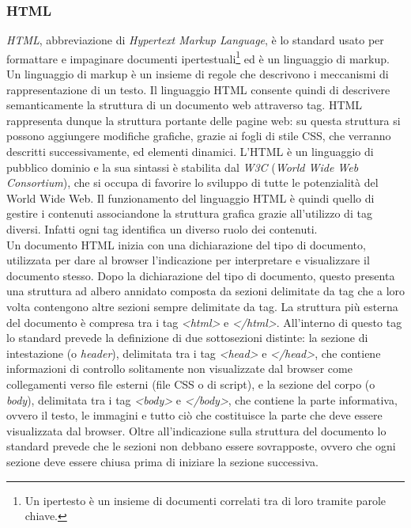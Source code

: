   \subsubsection{HTML}
  \textit{HTML}, abbreviazione di \textit{Hypertext Markup Language}, è lo standard usato per formattare e
  impaginare documenti
  ipertestuali\footnote{Un ipertesto è un insieme di documenti correlati tra di loro tramite parole chiave.} ed è un linguaggio
  di markup. Un linguaggio di markup è un insieme di regole che descrivono i meccanismi di rappresentazione di un testo. 
  Il linguaggio HTML consente quindi di descrivere semanticamente la struttura di un documento web attraverso tag. 
  HTML rappresenta dunque la struttura portante delle pagine web: su questa struttura si possono aggiungere modifiche grafiche,
  grazie ai fogli di stile CSS, che verranno descritti successivamente, ed elementi dinamici. L'HTML è un linguaggio di pubblico
  dominio e la sua sintassi è stabilita dal \textit{W3C} (\textit{World Wide Web Consortium}), che si occupa di favorire lo
  sviluppo di tutte le potenzialità del World Wide Web. Il funzionamento del linguaggio HTML è quindi quello di gestire i
  contenuti associandone la struttura grafica grazie all'utilizzo di tag diversi. Infatti ogni tag identifica un diverso ruolo
  dei contenuti.\\
  
  Un documento HTML inizia con una dichiarazione del tipo di documento, utilizzata per dare al browser l'indicazione
  per interpretare e visualizzare il documento stesso. Dopo la dichiarazione del tipo di documento, questo 
  presenta una struttura ad albero annidato composta da sezioni delimitate da tag che a loro volta contengono altre 
  sezioni sempre delimitate da tag. La struttura più esterna del documento è compresa tra i tag \textit{\textless html\textgreater}
  e \textit{\textless /html\textgreater}. All'interno di questo tag lo standard prevede la definizione di due sottosezioni
  distinte: la sezione di intestazione (o \textit{header}), delimitata tra i tag \textit{\textless head\textgreater} e 
  \textit{\textless /head\textgreater}, che contiene informazioni di controllo solitamente non visualizzate dal browser come
  collegamenti verso file esterni (file CSS o di script), e la sezione del corpo (o \textit{body}), delimitata tra i tag 
  \textit{\textless body\textgreater} e \textit{\textless /body\textgreater}, che contiene la parte
  informativa, ovvero il testo, le immagini e tutto ciò che costituisce la parte che deve essere visualizzata dal browser.
  Oltre all'indicazione sulla struttura del documento lo standard prevede che le sezioni non debbano essere sovrapposte,
  ovvero che ogni sezione deve essere chiusa prima di iniziare la sezione successiva.

